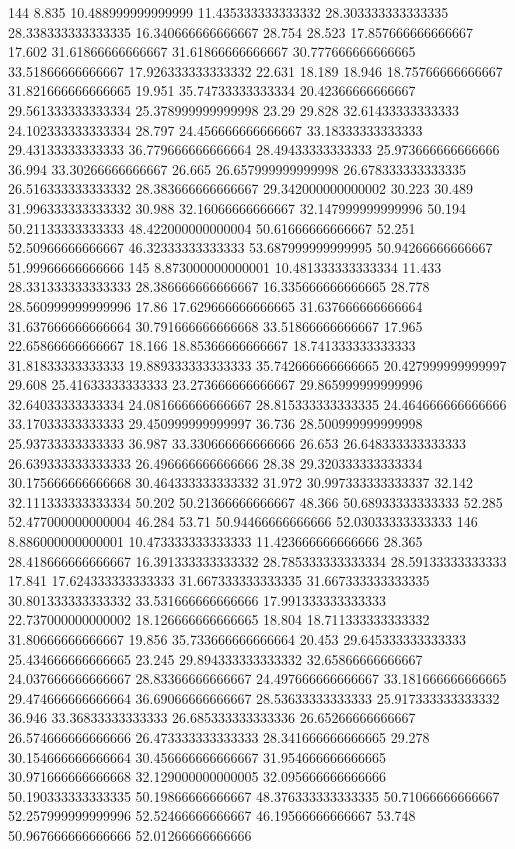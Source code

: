 144 8.835 10.488999999999999 11.435333333333332 28.303333333333335 28.338333333333335 16.340666666666667 28.754 28.523 17.857666666666667 17.602 31.61866666666667 31.61866666666667 30.777666666666665 33.51866666666667 17.926333333333332 22.631 18.189 18.946 18.75766666666667 31.821666666666665 19.951 35.74733333333334 20.42366666666667 29.561333333333334 25.378999999999998 23.29 29.828 32.61433333333333 24.102333333333334 28.797 24.456666666666667 33.18333333333333 29.43133333333333 36.779666666666664 28.49433333333333 25.973666666666666 36.994 33.30266666666667 26.665 26.657999999999998 26.678333333333335 26.516333333333332 28.383666666666667 29.342000000000002 30.223 30.489 31.996333333333332 30.988 32.16066666666667 32.147999999999996 50.194 50.21133333333333 48.422000000000004 50.61666666666667 52.251 52.50966666666667 46.32333333333333 53.687999999999995 50.94266666666667 51.99966666666666
145 8.873000000000001 10.481333333333334 11.433 28.331333333333333 28.386666666666667 16.335666666666665 28.778 28.560999999999996 17.86 17.629666666666665 31.637666666666664 31.637666666666664 30.791666666666668 33.51866666666667 17.965 22.65866666666667 18.166 18.85366666666667 18.741333333333333 31.81833333333333 19.889333333333333 35.742666666666665 20.427999999999997 29.608 25.41633333333333 23.273666666666667 29.865999999999996 32.64033333333334 24.081666666666667 28.815333333333335 24.464666666666666 33.17033333333333 29.450999999999997 36.736 28.500999999999998 25.93733333333333 36.987 33.330666666666666 26.653 26.648333333333333 26.639333333333333 26.496666666666666 28.38 29.320333333333334 30.175666666666668 30.464333333333332 31.972 30.997333333333337 32.142 32.111333333333334 50.202 50.21366666666667 48.366 50.68933333333333 52.285 52.477000000000004 46.284 53.71 50.94466666666666 52.03033333333333
146 8.886000000000001 10.473333333333333 11.423666666666666 28.365 28.418666666666667 16.391333333333332 28.785333333333334 28.59133333333333 17.841 17.624333333333333 31.667333333333335 31.667333333333335 30.801333333333332 33.531666666666666 17.991333333333333 22.737000000000002 18.126666666666665 18.804 18.711333333333332 31.80666666666667 19.856 35.733666666666664 20.453 29.645333333333333 25.434666666666665 23.245 29.894333333333332 32.65866666666667 24.037666666666667 28.83366666666667 24.497666666666667 33.181666666666665 29.474666666666664 36.69066666666667 28.53633333333333 25.917333333333332 36.946 33.36833333333333 26.685333333333336 26.65266666666667 26.574666666666666 26.473333333333333 28.341666666666665 29.278 30.154666666666664 30.456666666666667 31.954666666666665 30.971666666666668 32.129000000000005 32.095666666666666 50.190333333333335 50.19866666666667 48.376333333333335 50.71066666666667 52.257999999999996 52.52466666666667 46.19566666666667 53.748 50.967666666666666 52.01266666666666

